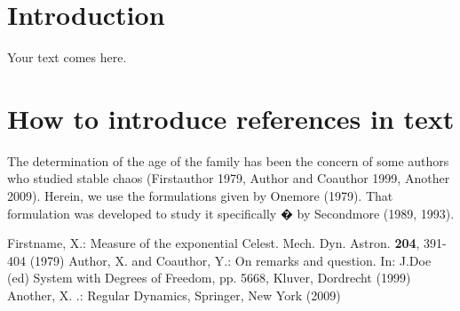 \documentclass[smallcondensed]{svjour3}    %
\begin{document}
\section{Introduction}
\label{intro}

Your text comes here. 
\section{How to introduce references in text}
The determination of the age of the family has been the concern of some authors who studied stable chaos (Firstauthor 1979, Author and Coauthor 1999, Another 2009).
Herein, we use the formulations given by Onemore (1979). That formulation 
was developed to study it specifically � by Secondmore (1989, 1993).




\begin{thebibliography}{}
%

%


Firstname, X.:
Measure of the exponential
Celest. Mech. Dyn. Astron. {\bf 204}, 391-404 (1979)
Author, X. and Coauthor, Y.: 
On remarks and question. In: J.Doe (ed) System with Degrees of Freedom, pp. 5668, Kluver, Dordrecht (1999)
Another, X. .: 
Regular Dynamics, Springer, New York (2009)
\end{thebibliography}
\end{document}

